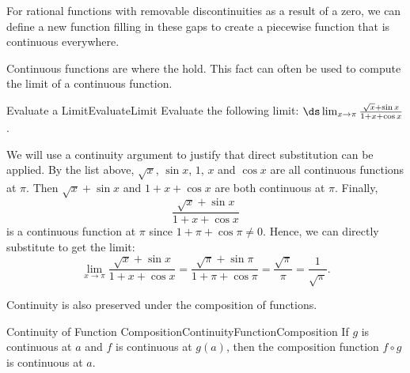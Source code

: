 For rational functions with removable discontinuities as a result of a zero, we can define a new function filling in these gaps to create a piecewise function that is continuous everywhere.

Continuous functions are where the  hold. This fact can often be used to compute the limit of a
continuous function.

\begin{example}{Evaluate a Limit}{EvaluateLimit}
Evaluate the following limit:
$\ds\lim_{x\to\pi}\frac{\sqrt{x}+\sin x}{1+x+\cos x}$.
\end{example}

\begin{solution} 
We will use a continuity argument to justify that direct substitution can be applied.
By the list above, $\sqrt{x}$, $\sin x$, $1$, $x$ and $\cos x$ are all continuous functions at $\pi$.
Then $\sqrt x+\sin x$ and $1+x+\cos x$ are both continuous at $\pi$.
Finally,
$$\frac{\sqrt{x}+\sin x}{1+x+\cos x}$$
is a continuous function at $\pi$ since $1+\pi+\cos\pi\neq 0$.
Hence, we can directly substitute to get the limit:
$$\lim_{x\to\pi}\frac{\sqrt{x}+\sin x}{1+x+\cos x}=\frac{\sqrt{\pi}+\sin \pi}{1+\pi+\cos \pi}=\frac{\sqrt{\pi}}{\pi}=\frac{1}{\sqrt{\pi}}.$$
\end{solution}

Continuity is also preserved under the composition of functions.

\begin{theorem}{Continuity of Function Composition}{ContinuityFunctionComposition}
If $g$ is continuous at $a$ and $f$ is continuous at $g(a)$, then the composition function $f\circ g$ is continuous at $a$.
\end{theorem}

